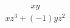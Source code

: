 \documentclass{jsarticle}
\begin{document}
\begin{align}
xy
\end{align}
\begin{align}
xz^{3}+(-1)yz^{2}
\end{align}
\end{document}

